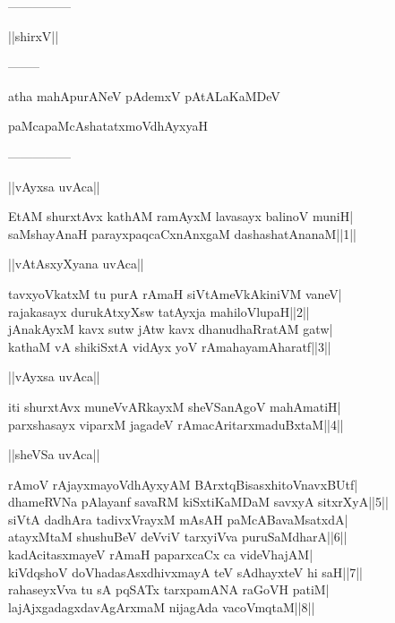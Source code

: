 \documentclass{article}
\begin{document}
\begin{center}
---------------
\end{center}

\begin{center}
||shirxV||
\end{center}

\begin{center}
--------
\end{center}

\begin{center}
atha mahApurANeV pAdemxV pAtALaKaMDeV
\end{center}

\begin{center}
paMcapaMcAshatatxmoVdhAyxyaH
\end{center}

\begin{center}
---------------
\end{center}

\begin{center}
||vAyxsa uvAca||
\end{center}

EtAM shurxtAvx kathAM ramAyxM lavasayx balinoV muniH|\\
saMshayAnaH parayxpaqcaCxnAnxgaM dashashatAnanaM||1||\\

\begin{center}
||vAtAsxyXyana uvAca||
\end{center}

tavxyoVkatxM tu purA rAmaH siVtAmeVkAkiniVM vaneV|\\
rajakasayx durukAtxyXsw tatAyxja mahiloVlupaH||2||\\
jAnakAyxM kavx sutw jAtw kavx dhanudhaRratAM gatw|\\
kathaM vA shikiSxtA vidAyx yoV rAmahayamAharatf||3||\\

\begin{center}
||vAyxsa uvAca||
\end{center}

iti shurxtAvx muneVvARkayxM sheVSanAgoV mahAmatiH|\\
parxshasayx viparxM jagadeV rAmacAritarxmaduBxtaM||4||\\

\begin{center}
||sheVSa uvAca||
\end{center}

rAmoV rAjayxmayoVdhAyxyAM BArxtqBisasxhitoVnavxBUtf|\\
dhameRVNa pAlayanf savaRM kiSxtiKaMDaM savxyA sitxrXyA||5||\\
siVtA dadhAra tadivxVrayxM mAsAH paMcABavaMsatxdA|\\
atayxMtaM shushuBeV deVviV tarxyiVva puruSaMdharA||6||\\
kadAcitasxmayeV rAmaH paparxcaCx ca videVhajAM|\\
kiVdqshoV doVhadasAsxdhivxmayA teV sAdhayxteV hi saH||7||\\
rahaseyxVva tu sA pqSATx tarxpamANA raGoVH patiM|\\
lajAjxgadagxdavAgArxmaM nijagAda vacoVmqtaM||8||\\
\end{document}
